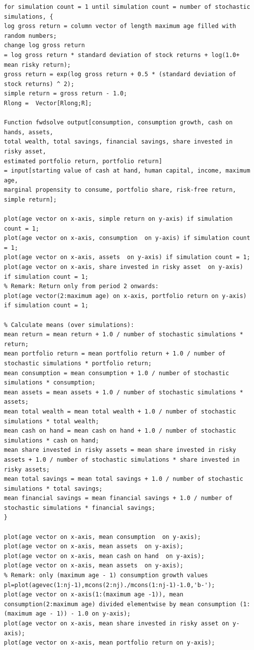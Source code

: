 \documentclass[12pt,a4paper]{article}
\begin{document}
\begin{lstlisting}[frame=single]
for simulation count = 1 until simulation count = number of stochastic simulations, {
log gross return = column vector of length maximum age filled with random numbers;
change log gross return
= log gross return * standard deviation of stock returns + log(1.0+ mean risky return);
gross return = exp(log gross return + 0.5 * (standard deviation of stock returns) ^ 2);
simple return = gross return - 1.0;
Rlong =  Vector[Rlong;R];

Function fwdsolve output[consumption, consumption growth, cash on hands, assets,
total wealth, total savings, financial savings, share invested in risky asset,
estimated portfolio return, portfolio return]
= input[starting value of cash at hand, human capital, income, maximum age,
marginal propensity to consume, portfolio share, risk-free return, simple return];

plot(age vector on x-axis, simple return on y-axis) if simulation count = 1;
plot(age vector on x-axis, consumption  on y-axis) if simulation count = 1;
plot(age vector on x-axis, assets  on y-axis) if simulation count = 1;
plot(age vector on x-axis, share invested in risky asset  on y-axis) if simulation count = 1;
% Remark: Return only from period 2 onwards:
plot(age vector(2:maximum age) on x-axis, portfolio return on y-axis) if simulation count = 1;

% Calculate means (over simulations):
mean return = mean return + 1.0 / number of stochastic simulations * return;
mean portfolio return = mean portfolio return + 1.0 / number of stochastic simulations * portfolio return;
mean consumption = mean consumption + 1.0 / number of stochastic simulations * consumption;
mean assets = mean assets + 1.0 / number of stochastic simulations * assets;
mean total wealth = mean total wealth + 1.0 / number of stochastic simulations * total wealth;
mean cash on hand = mean cash on hand + 1.0 / number of stochastic simulations * cash on hand;
mean share invested in risky assets = mean share invested in risky assets + 1.0 / number of stochastic simulations * share invested in risky assets;
mean total savings = mean total savings + 1.0 / number of stochastic simulations * total savings;
mean financial savings = mean financial savings + 1.0 / number of stochastic simulations * financial savings;
}

plot(age vector on x-axis, mean consumption  on y-axis);
plot(age vector on x-axis, mean assets  on y-axis);
plot(age vector on x-axis, mean cash on hand  on y-axis);
plot(age vector on x-axis, mean assets  on y-axis);
% Remark: only (maximum age - 1) consumption growth values
pl=plot(agevec(1:nj-1),mcons(2:nj)./mcons(1:nj-1)-1.0,'b-');
plot(age vector on x-axis(1:(maximum age -1)), mean consumption(2:maximum age) divided elementwise by mean consumption (1:(maximum age - 1)) - 1.0 on y-axis);
plot(age vector on x-axis, mean share invested in risky asset on y-axis);
plot(age vector on x-axis, mean portfolio return on y-axis);


\end{lstlisting}
\end{document}

